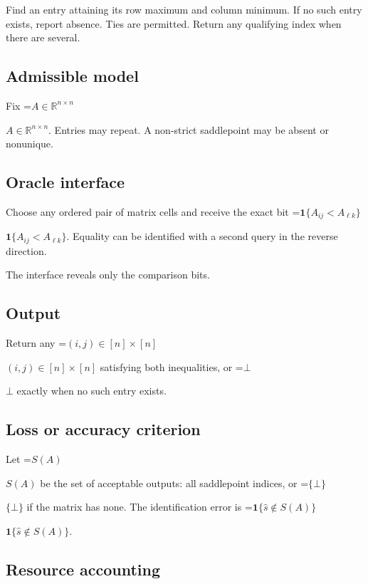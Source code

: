 \documentclass[10pt,a4paper]{article}
\newcommand{\AtlasMath}[1]{\par\begingroup\centering\setbox0=\hbox{$\displaystyle #1$}\ifdim\wd0>1.4\linewidth\typeout{ATLAS WIDE FORMULA: \the\wd0}\fi\ifdim\wd0>\linewidth\resizebox{\linewidth}{!}{\box0}\else\box0\fi\par\endgroup}
\newcommand{\AtlasInlineMath}[1]{\begingroup\setbox0=\hbox{$#1$}\ifdim\wd0>.4\linewidth\endgroup\AtlasMath{#1}\else\endgroup$#1$\fi}
\begin{document}
Find an entry attaining its row maximum and column minimum. If no such entry exists, report absence. Ties are permitted. Return any qualifying index when there are several.



\subsection{Admissible model}


Fix \AtlasInlineMath{A\in\mathbb R^{n\times n}}. Entries may repeat. A non-strict saddlepoint may be absent or nonunique.



\subsection{Oracle interface}


Choose any ordered pair of matrix cells and receive the exact bit \AtlasInlineMath{\mathbf{1}\{A_{ij}<A_{\ell k}\}}. Equality can be identified with a second query in the reverse direction.



The interface reveals only the comparison bits.



\subsection{Output}


Return any \AtlasInlineMath{(i,j)\in[n]\times[n]} satisfying both inequalities, or \AtlasInlineMath{\bot} exactly when no such entry exists.



\subsection{Loss or accuracy criterion}


Let \AtlasInlineMath{S(A)} be the set of acceptable outputs: all saddlepoint indices, or \AtlasInlineMath{\{\bot\}} if the matrix has none. The identification error is \AtlasInlineMath{\mathbf{1}\{\widehat s\notin S(A)\}}.



\subsection{Resource accounting}
\end{document}
